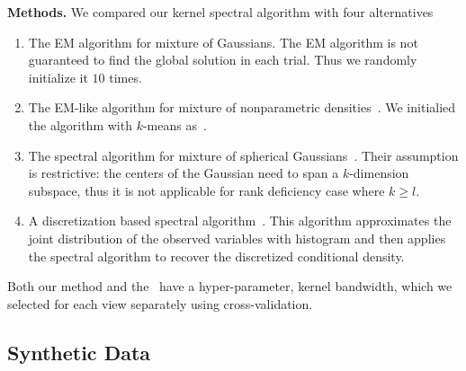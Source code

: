 \documentclass{article}
\begin{document}
{\bf Methods.} We compared our kernel spectral algorithm with four alternatives
\begin{enumerate}
  \vspace{-1mm}
  \item The EM algorithm for mixture of Gaussians. The EM algorithm is not guaranteed to find the global solution in each trial. Thus we randomly initialize it $10$ times.
  \item The EM-like algorithm for mixture of nonparametric densities~\citep{BenChaHun09}. We initialied the algorithm with $k$-means as~\citet{BenChaHun09}.
  \item The spectral algorithm for mixture of spherical Gaussians~\citep{HsuKak13}. Their assumption is restrictive: the centers of the Gaussian need to span a $k$-dimension subspace, thus it is not applicable for rank deficiency case where $k\ge l$.
  \item A discretization based spectral algorithm~\citep{HirKat10}. This algorithm approximates the joint distribution of the observed variables with histogram and then applies the spectral algorithm to recover the discretized conditional density.
  \vspace{-1mm}
\end{enumerate}
Both our method and the~\cite{BenChaHun09} have a hyper-parameter, kernel bandwidth, which we selected for each view separately using cross-validation.

\vspace{-3mm}
\subsection{Synthetic Data}
\vspace{-2mm}
\end{document}
